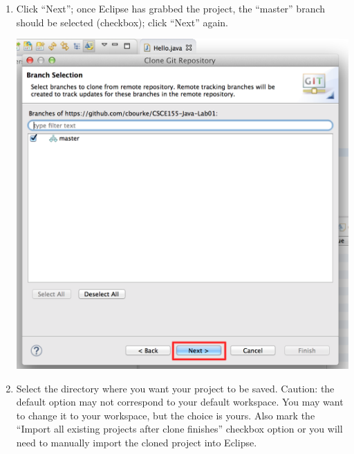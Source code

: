 \documentclass[12pt]{scrartcl}
\begin{document}
\begin{enumerate}
\begin{center}
	\end{center}
  \item Click ``Next''; once Eclipse has grabbed the project, the ``master'' branch should
  	be selected (checkbox); click ``Next'' again.
  	\begin{center}
	\includegraphics[scale=0.35]{eclipseCloneDialogBMarkUp}
	\end{center}
  \item Select the directory where you want your project to be saved.  Caution: the default
  	option may not correspond to your default workspace.  You may want to change
	it to your workspace, but the choice is yours.  Also mark the ``Import all existing 
	projects after clone finishes'' checkbox option or you will need
  	to manually import the cloned project into Eclipse.
  	\begin{center}

\end{center}
\end{enumerate}
\end{document}
